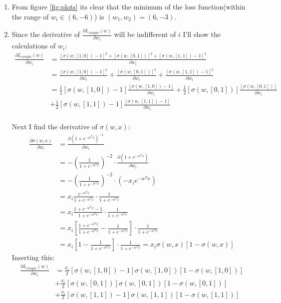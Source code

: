 \documentclass{article}
\begin{document}
\begin{enumerate}
\item From  figure \ref{fig:plots} its clear that the minimum of the loss
  function(within the range of $w_i \in (6,-6)$) is $(w_1,w_2 ) = (6, -3) $.
\item Since the derivative of $\frac{\partial L_{simple}(w)}{\partial w_i}$ will
  be indifferent of $i$ I'll show the calculations of $w_i$:
  \begin{align*}
    \frac{\partial L_{simple}(w)}{\partial w_i} &= \frac{
      \left[ \sigma(w,[1,0]) -1 \right]^2 +
      \left[ \sigma(w,[0,1]) \right]^2 +
      \left[ \sigma(w,[1,1]) -1 \right]^2
      }{ \partial w_i }\\
    &=
    \frac{\left[ \sigma(w,[1,0]) -1 \right]^2}{\partial w_i} +
    \frac{\left[ \sigma(w,[0,1]) \right]^2}{\partial w_i} +
    \frac{\left[ \sigma(w,[1,1]) -1 \right]^2}{\partial w_i}\\
    &=
    \frac{1}{2} \left[ \sigma(w,[1,0]) -1 \right] \frac{\left[ \sigma(w,[1,0]) -1 \right]}{\partial w_i} +
      \frac{1}{2} \left[ \sigma(w,[0,1]) \right] \frac{\left[ \sigma(w,[0,1]) \right]}{\partial w_i} \\
    &+ \frac{1}{2} \left[ \sigma(w,[1,1]) -1 \right] \frac{\left[ \sigma(w,[1,1]) -1 \right]}{\partial w_i} \\
  \end{align*}

  Next I find the derivative of $\sigma(w, x)$:
  \begin{align*}
    \frac{\partial \sigma (w,x) }{ \partial w_i} &= \frac{ \partial (1+e^{-w^Tx} )^{ -1 }}{\partial w_i}  \\
    &= - \left( \frac{1}{1+e^{-w^Tx}} \right)^{-2} \cdot \frac{\partial ( 1+e^{-w^Tx} )}{\partial w_i} \\
    &= - \left( \frac{1}{1+e^{-w^Tx}} \right)^{-2} \cdot (-x_i e^{-w^Tx}) \\
    &= x_i \frac{e^{-w^Tx}}{1+e^{-w^Tx}} \cdot \frac{1}{1+e^{-w^Tx}} \\
    &= x_i \frac{1+e^{-w^Tx}-1}{1+e^{-w^Tx}} \cdot \frac{1}{1+e^{-w^Tx}} \\
    &= x_i \left[ \frac{1+e^{-w^Tx}}{1+e^{-w^Tx}} - \frac{1}{1+e^{-w^Tx}} \right] \cdot \frac{1}{1+e^{-w^Tx}} \\
    &= x_i \left[ 1 - \frac{1}{1+e^{-w^Tx}} \right] \cdot \frac{1}{1+e^{-w^Tx}} = x_i \sigma (w,x) \left[ 1 - \sigma (w,x) \right]
  \end{align*}
  Inserting this:
  \begin{align*}
    \frac{\partial L_{simple}(w)}{\partial w_i} &=
      \frac{x_i}{2} \left[ \sigma(w,[1,0]) -1 \right] \sigma (w,[1,0]) \left[ 1 - \sigma (w,[1,0]) \right] \\
      &+ \frac{x_i}{2} \left[ \sigma(w,[0,1]) \right] \sigma (w,[0,1]) \left[ 1 - \sigma (w,[0,1]) \right] \\
      &+ \frac{x_i}{2} \left[ \sigma(w,[1,1]) -1 \right] \sigma (w,[1,1]) \left[ 1 - \sigma (w,[1,1]) \right] \\
  \end{align*}


\end{enumerate}
\end{document}
